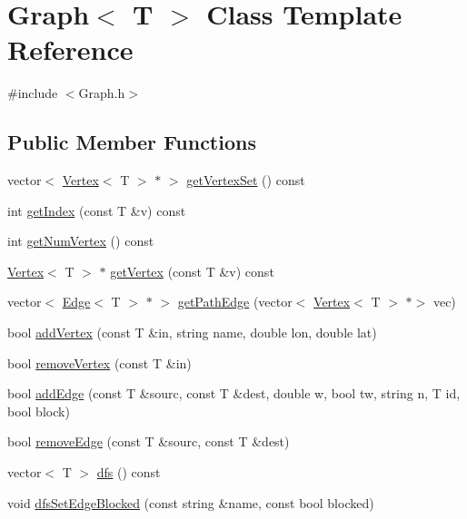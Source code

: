 \hypertarget{class_graph}{}\section{Graph$<$ T $>$ Class Template Reference}
\label{class_graph}


{\ttfamily \#include $<$Graph.\+h$>$}

\subsection*{Public Member Functions}
\begin{DoxyCompactItemize}
\item 
vector$<$ \mbox{\hyperlink{class_vertex}{Vertex}}$<$ T $>$ $\ast$ $>$ \mbox{\hyperlink{class_graph_a923b43995f81ad9319bbc81a1e433e64}{get\+Vertex\+Set}} () const
\item 
int \mbox{\hyperlink{class_graph_a5ab00b73eacf2bdae73d728e55144730}{get\+Index}} (const T \&v) const
\item 
int \mbox{\hyperlink{class_graph_a0853eac15cdf0f06d63f4b8a7820ec71}{get\+Num\+Vertex}} () const
\item 
\mbox{\hyperlink{class_vertex}{Vertex}}$<$ T $>$ $\ast$ \mbox{\hyperlink{class_graph_a67453d232f04e85c642b51554df1bc6a}{get\+Vertex}} (const T \&v) const
\item 
vector$<$ \mbox{\hyperlink{class_edge}{Edge}}$<$ T $>$ $\ast$ $>$ \mbox{\hyperlink{class_graph_a2cd549a2180e69d5a040eea5e5fcdb96}{get\+Path\+Edge}} (vector$<$ \mbox{\hyperlink{class_vertex}{Vertex}}$<$ T $>$ $\ast$$>$ vec)
\item 
bool \mbox{\hyperlink{class_graph_a780d19e96c98dff1902d8ae673c755ca}{add\+Vertex}} (const T \&in, string name, double lon, double lat)
\item 
bool \mbox{\hyperlink{class_graph_af9c903104ad69a7782979fa9caedf163}{remove\+Vertex}} (const T \&in)
\item 
bool \mbox{\hyperlink{class_graph_a044ef99e5308d662117ee021e2a0eeeb}{add\+Edge}} (const T \&sourc, const T \&dest, double w, bool tw, string n, T id, bool block)
\item 
bool \mbox{\hyperlink{class_graph_a1106092a37366486cf55576f9ec01692}{remove\+Edge}} (const T \&sourc, const T \&dest)
\item 
vector$<$ T $>$ \mbox{\hyperlink{class_graph_ae71a01383d3232c98ed1216fc52f2474}{dfs}} () const
\item 
void \mbox{\hyperlink{class_graph_a99f1bd2b6751af18c9f4fe998b1276a3}{dfs\+Set\+Edge\+Blocked}} (const string \&name, const bool blocked)
$$
\end{DoxyCompactItemize}

